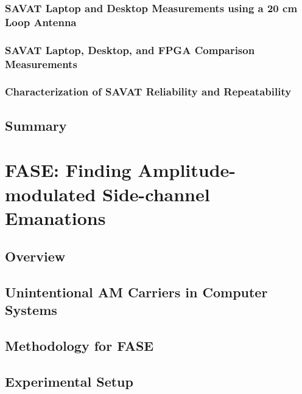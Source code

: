 \documentclass[12pt]{gatech-thesis}
\begin{document}
\subsection{SAVAT Laptop and Desktop Measurements using a 20 cm Loop Antenna}
\label{savat-20cm}


\subsection{SAVAT Laptop, Desktop, and FPGA Comparison Measurements}


\subsection{Characterization of SAVAT Reliability and Repeatability}
\label{savat-characterization}


\section{Summary}


%

\chapter{FASE: Finding Amplitude-modulated Side-channel Emanations}
\label{sec:fase}
\section{Overview}


\section{Unintentional AM Carriers in Computer Systems}
\label{sec:fase-am-devices}


\section{Methodology for FASE}
\label{sec:fase-methodology}


\section{Experimental Setup}
\label{sec:fase-setup}

\end{document}
